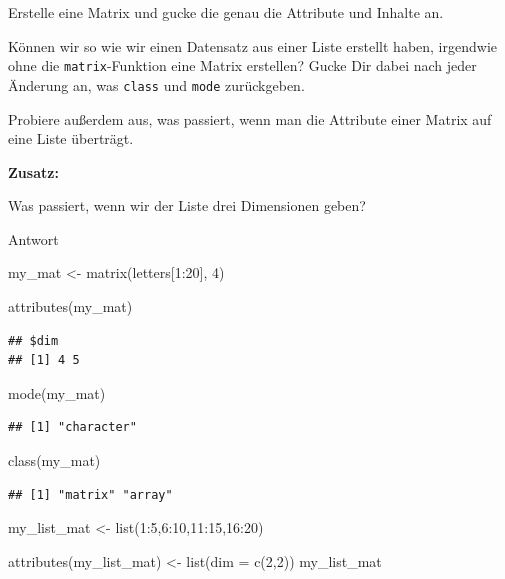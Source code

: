 \documentclass[
]{book}
\newenvironment{Shaded}{\begin{snugshade}}{\end{snugshade}}
\newcommand{\AttributeTok}[1]{\textcolor[rgb]{0.77,0.63,0.00}{#1}}
\newcommand{\DecValTok}[1]{\textcolor[rgb]{0.00,0.00,0.81}{#1}}
\newcommand{\FunctionTok}[1]{\textcolor[rgb]{0.00,0.00,0.00}{#1}}
\newcommand{\NormalTok}[1]{#1}
\newcommand{\OtherTok}[1]{\textcolor[rgb]{0.56,0.35,0.01}{#1}}
\newcommand{\SpecialCharTok}[1]{\textcolor[rgb]{0.00,0.00,0.00}{#1}}
\begin{document}
Erstelle eine Matrix und gucke die genau die Attribute und Inhalte an.

Können wir so wie wir einen Datensatz aus einer Liste erstellt haben, irgendwie ohne die \texttt{matrix}-Funktion eine Matrix erstellen? Gucke Dir dabei nach jeder Änderung an, was \texttt{class} und \texttt{mode} zurückgeben.

Probiere außerdem aus, was passiert, wenn man die Attribute einer Matrix auf eine Liste überträgt.

\textbf{Zusatz:}

Was passiert, wenn wir der Liste drei Dimensionen geben?

Antwort

\begin{Shaded}
\begin{Highlighting}[]
\NormalTok{my\_mat }\OtherTok{\textless{}{-}} \FunctionTok{matrix}\NormalTok{(letters[}\DecValTok{1}\SpecialCharTok{:}\DecValTok{20}\NormalTok{],}
                 \DecValTok{4}\NormalTok{)}

\FunctionTok{attributes}\NormalTok{(my\_mat)}
\end{Highlighting}
\end{Shaded}

\begin{verbatim}
## $dim
## [1] 4 5
\end{verbatim}

\begin{Shaded}
\begin{Highlighting}[]
\FunctionTok{mode}\NormalTok{(my\_mat)}
\end{Highlighting}
\end{Shaded}

\begin{verbatim}
## [1] "character"
\end{verbatim}

\begin{Shaded}
\begin{Highlighting}[]
\FunctionTok{class}\NormalTok{(my\_mat)}
\end{Highlighting}
\end{Shaded}

\begin{verbatim}
## [1] "matrix" "array"
\end{verbatim}

\begin{Shaded}
\begin{Highlighting}[]
\NormalTok{my\_list\_mat }\OtherTok{\textless{}{-}} \FunctionTok{list}\NormalTok{(}\DecValTok{1}\SpecialCharTok{:}\DecValTok{5}\NormalTok{,}\DecValTok{6}\SpecialCharTok{:}\DecValTok{10}\NormalTok{,}\DecValTok{11}\SpecialCharTok{:}\DecValTok{15}\NormalTok{,}\DecValTok{16}\SpecialCharTok{:}\DecValTok{20}\NormalTok{)}

\FunctionTok{attributes}\NormalTok{(my\_list\_mat) }\OtherTok{\textless{}{-}} \FunctionTok{list}\NormalTok{(}\AttributeTok{dim =} \FunctionTok{c}\NormalTok{(}\DecValTok{2}\NormalTok{,}\DecValTok{2}\NormalTok{))}
\NormalTok{my\_list\_mat}
\end{Highlighting}
\end{Shaded}
\end{document}
